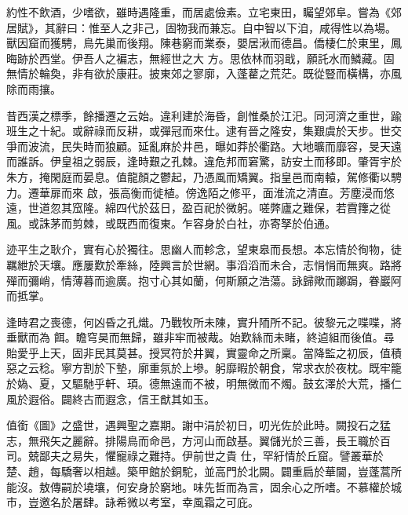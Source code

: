 \begin{pinyinscope}
 約性不飲酒，少嗜欲，雖時遇隆重，而居處儉素。立宅東田，矚望郊阜。嘗為《郊居賦》，其辭曰：惟至人之非己，固物我而兼忘。自中智以下洎，咸得性以為場。獸因窟而獲騁，鳥先巢而後翔。陳巷窮而業泰，嬰居湫而德昌。僑棲仁於東里，鳳晦跡於西堂。伊吾人之褊志，無經世之大
 方。思依林而羽戢，願託水而鱗藏。固無情於輪奐，非有欲於康莊。披東郊之寥廓，入蓬藋之荒茫。既從豎而橫構，亦風除而雨攘。



 昔西漢之標季，餘播遷之云始。違利建於海昏，創惟桑於江汜。同河濟之重世，踰班生之十紀。或辭祿而反耕，或彈冠而來仕。逮有晉之隆安，集艱虞於天步。世交爭而波流，民失時而狼顧。延亂麻於井邑，曝如莽於衢路。大地曠而靡容，旻天遠而誰訴。伊皇祖之弱辰，逢時艱之孔棘。違危邦而窘驚，訪安土而移即。肇胥宇於朱方，掩閑庭而晏息。值龍顏之鬱起，乃憑風而矯翼。指皇邑而南轅，駕修衢以騁力。遷華扉而來
 啟，張高衡而徙植。傍逸陌之修平，面淮流之清直。芳塵浸而悠遠，世道忽其窊隆。綿四代於茲日，盈百祀於微躬。嗟弊廬之難保，若霣籜之從風。或誅茅而剪棘，或既西而復東。乍容身於白社，亦寄孥於伯通。



 迹平生之耿介，實有心於獨往。思幽人而軫念，望東皋而長想。本忘情於徇物，徒羈紲於天壤。應屢歎於牽絲，陸興言於世網。事滔滔而未合，志悁悁而無爽。路將殫而彌峭，情薄暮而逾廣。抱寸心其如蘭，何斯願之浩蕩。詠歸歟而躑跼，眷巖阿而抵掌。



 逢時君之喪德，何凶昏之孔熾。乃戰牧所未陳，實升陑所不記。彼黎元之喋喋，將垂獸而為
 餌。瞻穹昊而無歸，雖非牢而被胾。始歎絲而未睹，終逌組而後值。尋貽愛乎上天，固非民其莫甚。授冥符於井翼，實靈命之所稟。當降監之初辰，值積惡之云稔。寧方割於下墊，廓重氛於上墋。躬靡暇於朝食，常求衣於夜枕。既牢籠於媯、夏，又驅馳乎軒、頊。德無遠而不被，明無微而不燭。鼓玄澤於大荒，播仁風於遐俗。闢終古而遐念，信王猷其如玉。



 值銜《圖》之盛世，遇興聖之嘉期。謝中涓於初日，叨光佐於此時。闕投石之猛志，無飛矢之麗辭。排陽鳥而命邑，方河山而啟基。翼儲光於三善，長王職於百司。兢鄙夫之易失，懼寵祿之難持。伊前世之貴
 仕，罕紆情於丘窟。譬叢華於楚、趙，每驕奢以相越。築甲館於銅駝，並高門於北闕。闢重扃於華閫，豈蓬蒿所能沒。敖傳嗣於墝壤，何安身於窮地。味先哲而為言，固余心之所嗜。不慕權於城市，豈邀名於屠肆。詠希微以考室，幸風霜之可庇。




\end{pinyinscope}
